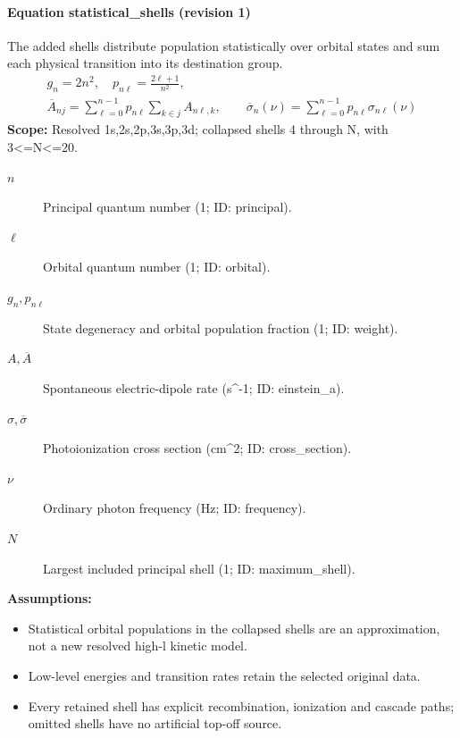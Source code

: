 
\paragraph{Equation statistical\_shells (revision 1)}
The added shells distribute population statistically over orbital states and sum each physical transition into its destination group.
\begin{equation}
\begin{aligned}
g_n=2n^2,\quad p_{n\ell}=\frac{2\ell+1}{n^2},\\\overline{A}_{nj}=\sum_{\ell=0}^{n-1}p_{n\ell}\sum_{k\in j}A_{n\ell,k},\qquad\overline{\sigma}_n(\nu)=\sum_{\ell=0}^{n-1}p_{n\ell}\sigma_{n\ell}(\nu)
\end{aligned}
\label{eq:escape.atom_5f_convergence:statistical_5f_shells:1}
\end{equation}
\noindent\textbf{Scope:} Resolved 1s,2s,2p,3s,3p,3d; collapsed shells 4 through N, with 3<=N<=20.

\begin{description}
\item[$n$] Principal quantum number (1; ID: principal).
\item[$\ell$] Orbital quantum number (1; ID: orbital).
\item[$g_n,p_{n\ell}$] State degeneracy and orbital population fraction (1; ID: weight).
\item[$A,\overline A$] Spontaneous electric-dipole rate (s\textasciicircum{}-1; ID: einstein\_a).
\item[$\sigma,\overline\sigma$] Photoionization cross section (cm\textasciicircum{}2; ID: cross\_section).
\item[$\nu$] Ordinary photon frequency (Hz; ID: frequency).
\item[$N$] Largest included principal shell (1; ID: maximum\_shell).
\end{description}

\noindent\textbf{Assumptions:}
\begin{itemize}
\item Statistical orbital populations in the collapsed shells are an approximation, not a new resolved high-l kinetic model.
\item Low-level energies and transition rates retain the selected original data.
\item Every retained shell has explicit recombination, ionization and cascade paths; omitted shells have no artificial top-off source.
\end{itemize}

